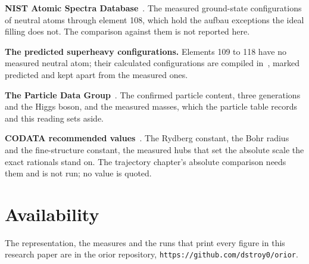 \textbf{NIST Atomic Spectra Database}~\cite{src:NIST-Atomic-Spectra-Database}. The measured
ground-state configurations of neutral atoms through element 108, which hold the aufbau exceptions the
ideal filling does not. The comparison against them is not reported here.

\textbf{The predicted superheavy configurations.} Elements 109 to 118 have no measured neutral atom;
their calculated configurations are compiled
in~\cite{src:Wikipedia-Electron-configurations-of-the-elements-data-page}, marked predicted and kept
apart from the measured ones.

\textbf{The Particle Data Group}~\cite{src:Particle-Data-Group}. The confirmed particle content, three
generations and the Higgs boson, and the measured masses, which the particle table records and this
reading sets aside.

\textbf{CODATA recommended values}~\cite{src:Mohr-et-al-2025}. The Rydberg constant, the Bohr radius
and the fine-structure constant, the measured hubs that set the absolute scale the exact rationals
stand on. The trajectory chapter's absolute comparison needs them and is not run; no value is quoted.

\section*{Availability}

The representation, the measures and the runs that print every figure in this research paper are in
the orior repository, \texttt{https://github.com/dstroy0/orior}.
